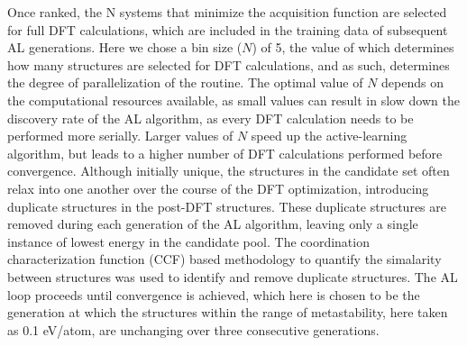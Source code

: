 %
Once ranked, the N systems that minimize the acquisition function are selected for full DFT calculations, which are included in the training data of subsequent AL generations.
%
Here we chose a bin size ($N$) of \num{5}, the value of which determines how many structures are selected for DFT calculations,
and as such, determines the degree of parallelization of the routine.
%
The optimal value of $N$ depends on the computational resources available, as small values can result in slow down the discovery rate of the AL algorithm,
as every DFT calculation needs to be performed more serially.
%
Larger values of $N$ speed up the active-learning algorithm, but leads to a higher number of DFT calculations performed before convergence.
%
Although initially unique, the structures in the candidate set often relax into one another over the course of the DFT optimization, introducing duplicate structures in the post-DFT structures.
%
These duplicate structures are removed during each generation of the AL algorithm, leaving only a single instance of lowest energy in the candidate pool.
%
The coordination characterization function (CCF) based methodology to quantify the simalarity between structures was used to identify and remove duplicate structures.\cite{Su2017}
%
The AL loop proceeds until convergence is achieved, which here is chosen to be the generation at which the structures within the range of metastability, here taken as \num{0.1} eV/atom, are unchanging over three consecutive generations.


